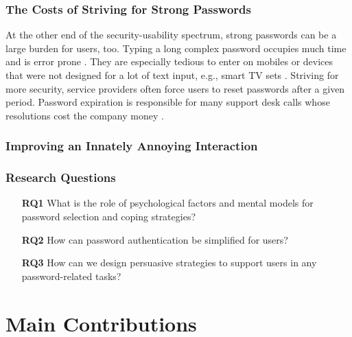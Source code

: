
\subsubsection{The Costs of Striving for Strong Passwords}
At the other end of the security-usability spectrum, strong passwords can be a large burden for users, too. Typing a long complex password occupies much time and is error prone \cite{Shay2014CanLongPasswordsBeSecureAndUsable}. They are especially tedious to enter on mobiles or devices that were not designed for a lot of text input, e.g., smart TV sets \cite{Melicher2016UsabilityMobileTextPasswords}. Striving for more security, service providers often force users to reset passwords after a given period. Password expiration is responsible for many support desk calls whose resolutions cost the company money \cite{Adams1999UsersEnemy, Sasse2005UsableSecurityPosition}. 

\subsubsection{Improving an Innately Annoying Interaction}


\subsubsection{Research Questions}

 


\begin{itemize}
	\item[\textbf{RQ1}] What is the role of psychological factors and mental models for password selection and coping strategies?
	\item[\textbf{RQ2}] How can password authentication be simplified for users? 
	\item[\textbf{RQ3}] How can we design persuasive strategies to support users in any password-related tasks?
\end{itemize}

\section{Main Contributions}
